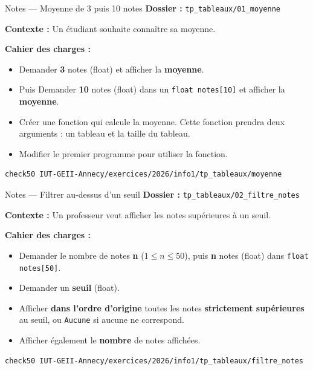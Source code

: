 \begin{UPSTIManipulation}{Notes — Moyenne de 3 puis 10 notes}
  \textbf{Dossier :} \texttt{tp\_tableaux/01\_moyenne}

  \textbf{Contexte :} Un étudiant souhaite connaître sa moyenne.

  \textbf{Cahier des charges :}
  \begin{itemize}
    \item Demander \textbf{3} notes (float) et afficher la \textbf{moyenne}.
    \item Puis Demander \textbf{10} notes (float) dans un \texttt{float notes[10]} et afficher la \textbf{moyenne}.
    \item Créer une fonction qui calcule la moyenne. Cette fonction prendra deux arguments : un tableau et la taille du tableau.
    \item Modifier le premier programme pour utiliser la fonction.
  \end{itemize}

  \tcblower
  \begin{lstlisting}[language=bash]
check50 IUT-GEII-Annecy/exercices/2026/info1/tp_tableaux/moyenne
  \end{lstlisting}
\end{UPSTIManipulation}


\begin{UPSTIManipulation}{Notes — Filtrer au-dessus d'un seuil}
  \textbf{Dossier :} \texttt{tp\_tableaux/02\_filtre\_notes}

  \textbf{Contexte :} Un professeur veut afficher les notes supérieures à un seuil.

  \textbf{Cahier des charges :}
  \begin{itemize}
    \item Demander le nombre de notes \textbf{n} ($1\le n \le 50$), puis \textbf{n} notes (float) dans \texttt{float notes[50]}.
    \item Demander un \textbf{seuil} (float).
    \item Afficher \textbf{dans l’ordre d’origine} toutes les notes \textbf{strictement supérieures} au seuil,
          ou \texttt{Aucune} si aucune ne correspond.
    \item Afficher également le \textbf{nombre} de notes affichées.
  \end{itemize}

  \tcblower
  \begin{lstlisting}[language=bash]
check50 IUT-GEII-Annecy/exercices/2026/info1/tp_tableaux/filtre_notes
  \end{lstlisting}
\end{UPSTIManipulation}


